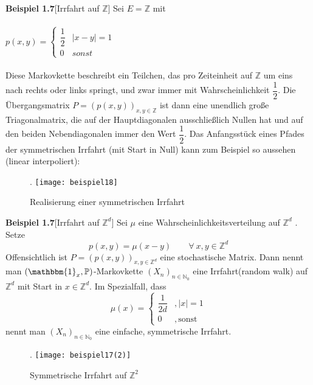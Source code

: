\textbf{Beispiel 1.7}[Irrfahrt auf $\mathbb{Z}$]
Sei $E = \mathbb{Z}$ mit
\\
\\
$p(x,y)=
\begin{cases}
\dfrac{1}{2} &  |x - y| = 1\\
0 & sonst
\end{cases}$
\\
\\
Diese Markovkette beschreibt ein Teilchen, das pro Zeiteinheit auf $\mathbb{Z}$ um eins nach rechts oder
links springt, und zwar immer mit Wahrscheinlichkeit $\dfrac{1}{2}$. Die Übergangsmatrix $P = (p(x,y))_{x,y \in \mathbb{Z}}$
ist dann eine unendlich große Triagonalmatrix, die auf der Hauptdiagonalen ausschließlich Nullen hat und auf den beiden Nebendiagonalen immer den Wert $\dfrac{1}{2}$.
Das Anfangsstück eines Pfades der symmetrischen Irrfahrt (mit Start in Null) kann zum Beispiel so aussehen (linear interpoliert):
\begin{figure}[H].
\centering
\texttt{[image: beispiel18]}
\caption{Realisierung einer symmetrischen Irrfahrt}
\end{figure}


\textbf{Beispiel 1.7}[Irrfahrt auf $\mathbb{Z}^{d}$]
Sei $\mu$ eine Wahrscheinlichkeitsverteilung auf $\mathbb{Z}^{d}$ . Setze
\begin{equation*}
p(x,y) = \mu(x-y) \qquad \forall \: x,y \in \mathbb{Z}^{d}
\end{equation*}
Offensichtlich ist $P =(p(x,y))_{x,y \in \mathbb{Z}^d}$ eine stochastische Matrix. Dann nennt man $(\mathbbm{1}_{x},\mathbb{P})$-Markovkette $(X_{n})_{n \in \mathbb{N}_{0}}$ eine Irrfahrt(random walk) auf $\mathbb{Z}^{d}$ mit Start in $x \in \mathbb{Z}^{d}$. Im Spezialfall, dass
\begin{equation*}
\mu(x)=
\begin{cases}
\dfrac{1}{2d} &  ,|x|=1\\
0 & ,\mathrm{sonst}
\end{cases}
\end{equation*}
nennt man $(X_{n})_{n \in \mathbb{N}_{0}}$ eine einfache, symmetrische Irrfahrt.
\begin{figure}[H].
\centering
\texttt{[image: beispiel17(2)]}
\caption{Symmetrische Irrfahrt auf $\mathbb{Z}^2$}
\end{figure}